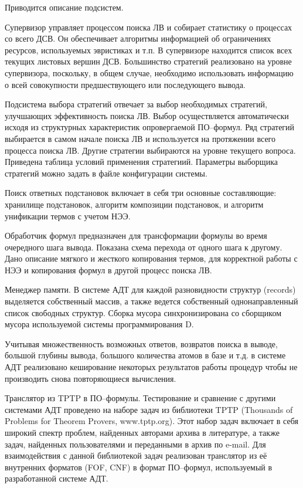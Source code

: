 \documentclass[a4paper]{report}
\begin{document}
Приводится описание подсистем.

Супервизор управляет процессом поиска ЛВ и собирает статистику о процессах со всего ДСВ. Он обеспечивает алгоритмы информацией об ограничениях ресурсов, используемых эвристиках и т.п. В супервизоре находится список всех текущих листовых вершин ДСВ. Большинство стратегий реализовано на уровне супервизора, поскольку, в общем случае, необходимо использовать информацию о всей совокупности предшествующего или последующего вывода.

Подсистема выбора стратегий отвечает за выбор необходимых стратегий, улучшающих эффективность поиска ЛВ. Выбор осуществляется автоматически исходя из структурных характеристик опровергаемой ПО--формул. Ряд стратегий выбирается в самом начале поиска ЛВ и используется на протяжении всего процесса поиска ЛВ. Другие стратегии выбираются на уровне текущего вопроса. Приведена таблица условий применения стратегиий. Параметры выборщика стратегий можно задать в файле конфигурации системы.

Поиск ответных подстановок включает в себя три основные составляющие: хранилище подстановок, алгоритм композиции подстановок, и алгоритм унификации термов с учетом НЭЭ.


Обработчик формул предназначен для трансформации формулы во время очередного шага вывода. Показана схема перехода от одного шага к другому. Дано описание мягкого и жесткого копирования термов, для корректной работы с НЭЭ и копирования формул в другой процесс поиска ЛВ.


Менеджер памяти. В системе АДТ для каждой разновидности структур (records) выделяется собственный массив, а также ведется собственный однонаправленный список свободных структур. Сборка мусора синхронизирована со сборщиком мусора используемой системы программирования D.


Учитывая множественность возможных ответов, возвратов поиска в выводе, большой глубины вывода, большого количества атомов в базе и т.д. в системе АДТ реализовано кеширование некоторых результатов работы процедур чтобы не производить снова повторяющиеся вычисления.

Транслятор из TPTP в ПО--формулы. Тестирование и сравнение с другими системами АДТ проведено на наборе задач из библиотеки TPTP (Thousands of Problems for Theorem Provers, www.tptp.org). Этот набор задач включает в себя широкий спектр проблем, найденных авторами архива в литературе, а также задач, найденных пользователями и переданными в архив по e-mail. Для взаимодействия с данной библиотекой задач реализован транслятор из её внутренних форматов (FOF, CNF) в формат ПО--формул, используемый в разработанной системе АДТ.
\end{document}
